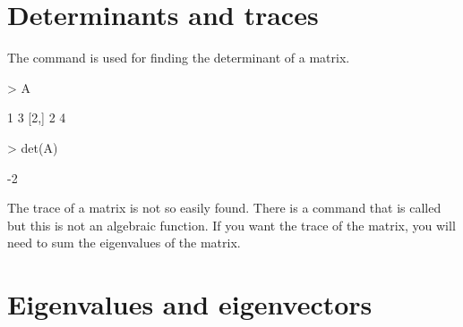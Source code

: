 \section{Determinants and traces} 
 
The  command is used for finding the determinant of a matrix. 
\begin{Schunk}
\begin{Sinput}
> A 
\end{Sinput}
\begin{Soutput}
     [,1] [,2]
[1,]    1    3
[2,]    2    4
\end{Soutput}
\begin{Sinput}
> det(A) 
\end{Sinput}
\begin{Soutput}
[1] -2
\end{Soutput}
\end{Schunk}
 
The trace of a matrix is not so easily found. There is a command that is called  but this is not an algebraic function. If you want the trace of the matrix, you will need to sum the eigenvalues of the matrix. 
 
\section{Eigenvalues and eigenvectors} 
 
